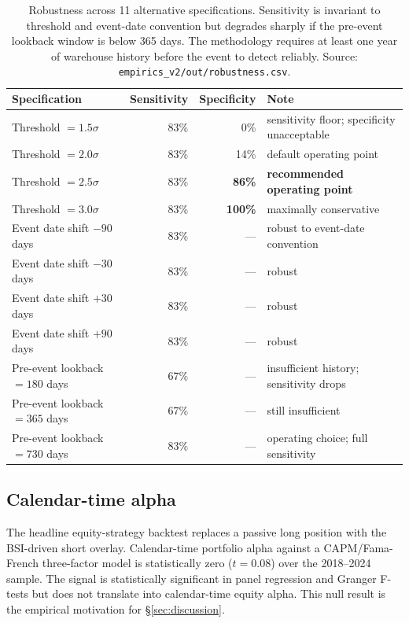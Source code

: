 \documentclass[11pt,a4paper]{article}
\begin{document}
\begin{table}[h]
\centering\small
\begin{tabular}{@{}lrrl@{}}
\toprule
\textbf{Specification} & \textbf{Sensitivity} & \textbf{Specificity} & \textbf{Note} \\
\midrule
Threshold $= 1.5\sigma$            & 83\% &   0\% & sensitivity floor; specificity unacceptable \\
Threshold $= 2.0\sigma$            & 83\% &  14\% & default operating point \\
Threshold $= 2.5\sigma$            & 83\% & \textbf{86\%} & \textbf{recommended operating point} \\
Threshold $= 3.0\sigma$            & 83\% & \textbf{100\%} & maximally conservative \\
\midrule
Event date shift $-90$ days        & 83\% & --- & robust to event-date convention \\
Event date shift $-30$ days        & 83\% & --- & robust \\
Event date shift $+30$ days        & 83\% & --- & robust \\
Event date shift $+90$ days        & 83\% & --- & robust \\
\midrule
Pre-event lookback $= 180$ days    & 67\% & --- & insufficient history; sensitivity drops \\
Pre-event lookback $= 365$ days    & 67\% & --- & still insufficient \\
Pre-event lookback $= 730$ days    & 83\% & --- & operating choice; full sensitivity \\
\bottomrule
\end{tabular}
\caption{Robustness across 11 alternative specifications. Sensitivity is invariant to threshold and event-date convention but degrades sharply if the pre-event lookback window is below 365 days. The methodology requires at least one year of warehouse history before the event to detect reliably. Source: \texttt{empirics\_v2/out/robustness.csv}.}\label{tab:robust}
\end{table}

\subsection{Calendar-time alpha}\label{sec:results_alpha}

The headline equity-strategy backtest replaces a passive long position with the BSI-driven short overlay. Calendar-time portfolio alpha against a CAPM/Fama-French three-factor model is statistically zero ($t = 0.08$) over the 2018--2024 sample. The signal is statistically significant in panel regression and Granger F-tests but does not translate into calendar-time equity alpha. This null result is the empirical motivation for §\ref{sec:discussion}.
\end{document}
